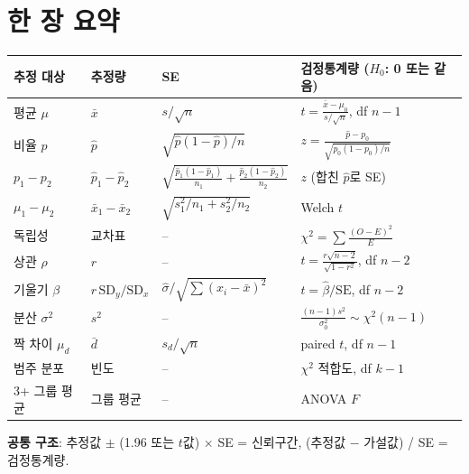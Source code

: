 \documentclass[11pt,a4paper]{article}
\newcommand{\SD}{\mathrm{SD}}
\newcommand{\SE}{\mathrm{SE}}
\begin{document}
\section{한 장 요약}
\begin{center}
\begin{tabular}{@{}p{2.6cm} p{3.4cm} p{3.6cm} p{4.6cm}@{}}
\toprule
추정 대상 & 추정량 & SE & 검정통계량 ($H_0$: 0 또는 같음) \\
\midrule
평균 $\mu$ & $\bar x$ & $s/\sqrt n$ & $t=\frac{\bar x-\mu_0}{s/\sqrt n}$, df $n-1$ \\
비율 $p$ & $\hat p$ & $\sqrt{\hat p(1-\hat p)/n}$ & $z=\frac{\hat p-p_0}{\sqrt{p_0(1-p_0)/n}}$ \\
$p_1-p_2$ & $\hat p_1-\hat p_2$ & $\sqrt{\frac{\hat p_1(1-\hat p_1)}{n_1}+\frac{\hat p_2(1-\hat p_2)}{n_2}}$ & $z$ (합친 $\hat p$로 SE) \\
$\mu_1-\mu_2$ & $\bar x_1-\bar x_2$ & $\sqrt{s_1^2/n_1+s_2^2/n_2}$ & Welch $t$ \\
독립성 & 교차표 & -- & $\chi^2=\sum\frac{(O-E)^2}E$ \\
상관 $\rho$ & $r$ & -- & $t=\frac{r\sqrt{n-2}}{\sqrt{1-r^2}}$, df $n-2$ \\
기울기 $\beta$ & $r\,\SD_y/\SD_x$ & $\hat\sigma/\sqrt{\sum(x_i-\bar x)^2}$ & $t=\hat\beta/\SE$, df $n-2$ \\
분산 $\sigma^2$ & $s^2$ & -- & $\frac{(n-1)s^2}{\sigma_0^2}\sim\chi^2(n-1)$ \\
짝 차이 $\mu_d$ & $\bar d$ & $s_d/\sqrt n$ & paired $t$, df $n-1$ \\
범주 분포 & 빈도 & -- & $\chi^2$ 적합도, df $k-1$ \\
3+ 그룹 평균 & 그룹 평균 & -- & ANOVA $F$ \\
\bottomrule
\end{tabular}
\end{center}
\textbf{공통 구조}: 추정값 $\pm$ (1.96 또는 $t$값) $\times$ SE = 신뢰구간, \quad (추정값 $-$ 가설값) / SE = 검정통계량.

\end{document}
